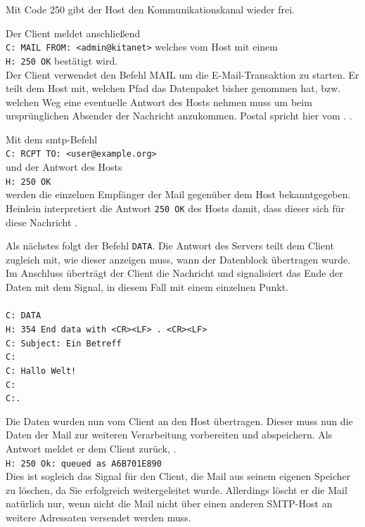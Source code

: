 Mit Code 250  \citep [][38]{rfc821} gibt der Host den Kommunikationskanal wieder frei.

Der Client meldet anschließend \\
\verb+C: MAIL FROM: <admin@kitanet>+ welches vom Host mit einem \\
\verb+H: 250 OK+ bestätigt wird.\\
Der Client verwendet den Befehl MAIL um die E-Mail-Transaktion zu starten. Er teilt dem Host mit, welchen Pfad das Datenpaket bisher genommen hat, bzw. welchen Weg eine eventuelle Antwort des Hosts nehmen muss um beim ursprünglichen Absender der Nachricht anzukommen. Postal spricht hier vom . \citep[vgl.][20]{rfc821}.

Mit dem \ac{smtp}-Befehl\\
\verb+C: RCPT TO: <user@example.org>+ \\ 
und der Antwort des Hosts \\
\verb+H: 250 OK+\\
werden die einzelnen Empfänger der Mail gegenüber dem Host bekanntgegeben. Heinlein interpretiert die Antwort \verb+250 OK+ des Hosts damit, dass dieser sich für diese Nachricht  \citep[vgl.][25]{Heinlein2004}.

Als nächstes folgt der Befehl \verb+DATA+. Die Antwort des Servers teilt dem Client zugleich mit, wie dieser anzeigen muss, wann der Datenblock übertragen wurde. Im Anschluss überträgt der Client die Nachricht und signalisiert das Ende der Daten mit dem Signal, in diesem Fall mit einem einzelnen Punkt.\\
\\
\verb+C: DATA+ \\
\verb+H: 354 End data with <CR><LF> . <CR><LF>+\\
\verb+C: Subject: Ein Betreff+ \\
\verb+C:+\\
\verb+C: Hallo Welt!+ \\
\verb+C:+\\ 
\verb+C:.+

Die Daten wurden nun vom Client an den Host übertragen. Dieser muss nun die Daten der Mail zur weiteren Verarbeitung vorbereiten und abspeichern. Als Antwort meldet er dem Client zurück,  \citep[][25]{Heinlein2004}.\\
\verb+H: 250 Ok: queued as A6B701E890+ \\
Dies ist sogleich das Signal für den Client, die Mail aus seinem eigenen Speicher zu löschen, da Sie erfolgreich weitergeleitet wurde. Allerdings löscht er die Mail natürlich nur, wenn nicht die Mail nicht über einen anderen SMTP-Host an weitere Adressaten versendet werden muss.

